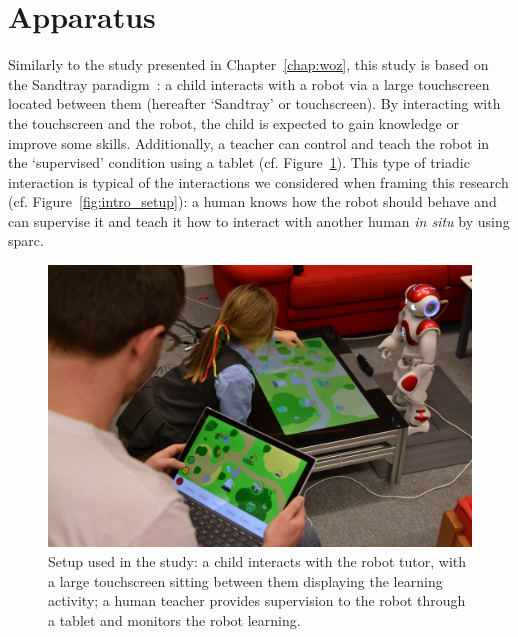 \section{Apparatus}

Similarly to the study presented in Chapter~\ref{chap:woz}, this study is based on the Sandtray paradigm~\citep{baxter2012touchscreen}: a child interacts with a robot via a large touchscreen located between them (hereafter `Sandtray' or touchscreen). By interacting with the touchscreen and the robot, the child is expected to gain knowledge or improve some skills. Additionally, a teacher can control and teach the robot in the `supervised' condition using a tablet (cf. Figure~\ref{fig:tutoring_setup}). This type of triadic interaction is typical of the interactions we considered when framing this research (cf. Figure~\ref{fig:intro_setup}): a human knows how the robot should behave and can supervise it and teach it how to interact with another human \textit{in situ} by using \gls{sparc}.


\begin{figure}[ht]
	\centering
	\includegraphics[width=1\textwidth]{setup.jpg}
	\caption{Setup used in the study: a child interacts with the robot tutor, with a large touchscreen sitting between them displaying the learning activity; a human teacher provides supervision to the robot through a tablet and monitors the robot learning.}
	\label{fig:tutoring_setup}
\end{figure}

